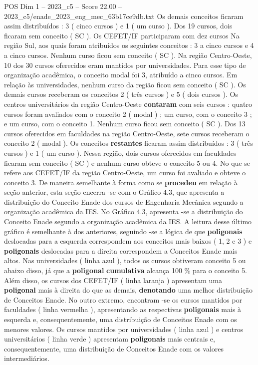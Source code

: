\begin{textsample}{POS Dim 1 – 2023\_c5 – Score 22.00 – 2023\_c5/enade\_2023\_eng\_mec\_63b17ce9db.txt}
Os demais conceitos ficaram assim distribuídos : 3 ( cinco cursos ) e 1 ( um curso ).
Dos 19 cursos, dois ficaram sem conceito ( SC ).
Os CEFET/IF participaram com dez cursos Na região Sul, aos quais foram atribuídos os seguintes conceitos : 3 a cinco cursos e 4 a cinco cursos.
Nenhum curso ficou sem conceito ( SC ).
Na região Centro-Oeste, 10 dos 30 cursos oferecidos eram mantidos por universidades.
Para esse tipo de organização acadêmica, o conceito modal foi 3, atribuído a cinco cursos.
Em relação às universidades, nenhum curso da região ficou sem conceito ( SC ).
Os demais cursos receberam os conceitos 2 ( três cursos ) e 5 ( dois cursos ).
Os centros universitários da região Centro-Oeste \textbf{contaram} com seis cursos : quatro cursos foram avaliados com o conceito 2 ( modal ) ; um curso, com o conceito 3 ; e um curso, com o conceito 1.
Nenhum curso ficou sem conceito ( SC ).
Dos 13 cursos oferecidos em faculdades na região Centro-Oeste, sete cursos receberam o conceito 2 ( modal ).
Os conceitos \textbf{restantes} ficaram assim distribuídos : 3 ( três cursos ) e 1 ( um curso ).
Nessa região, dois cursos oferecidos em faculdades ficaram sem conceito ( SC ) e nenhum curso obteve o conceito 5 ou 4.
No que se refere aos CEFET/IF da região Centro-Oeste, um curso foi avaliado e obteve o conceito 3.
De maneira semelhante à forma como se \textbf{procedeu} em relação à seção anterior, esta seção encerra -se com o Gráfico 4.3, que apresenta a distribuição do Conceito Enade dos cursos de Engenharia Mecânica segundo a organização acadêmica da IES.
No Gráfico 4.3, apresenta -se a distribuição do Conceito Enade segundo a organização acadêmica da IES.
A leitura desse último gráfico é semelhante à dos anteriores, seguindo -se a lógica de que \textbf{poligonais} deslocadas para a esquerda correspondem aos conceitos mais baixos ( 1, 2 e 3 ) e \textbf{poligonais} deslocadas para a direita correspondem a Conceitos Enade mais altos.
Nas universidades ( linha azul ), todos os cursos obtiveram conceito 5 ou abaixo disso, já que a \textbf{poligonal} \textbf{cumulativa} alcança 100 \% para o conceito 5.
Além disso, os cursos dos CEFET/IF ( linha laranja ) apresentam uma \textbf{poligonal} mais à direita do que as demais, \textbf{denotando} uma melhor distribuição de Conceitos Enade.
No outro extremo, encontram -se os cursos mantidos por faculdades ( linha vermelha ), apresentando as respectivas \textbf{poligonais} mais à esquerda e, consequentemente, uma distribuição de Conceitos Enade com os menores valores.
Os cursos mantidos por universidades ( linha azul ) e centros universitários ( linha verde ) apresentam \textbf{poligonais} mais centrais e, consequentemente, uma distribuição de Conceitos Enade com os valores intermediários.

\end{textsample}

